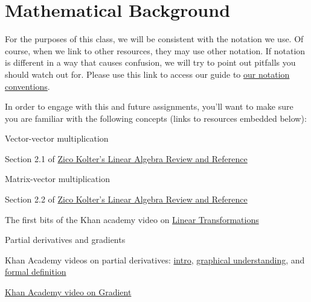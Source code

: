 \documentclass[assignment01_Solutions]{subfiles}
\begin{document}
\section{Mathematical Background}


\begin{notice}
For the purposes of this class, we will be consistent with the notation we use.  Of course, when we link to other resources, they may use other notation.  If notation is different in a way that causes confusion, we will try to point out pitfalls you should watch out for.  Please use this link to access our guide to \href{https://github.com/mlfa19/assignments/blob/master/supplementary_documents/notation_conventions.pdf}{our notation conventions}.
\end{notice}

\begin{externalresources}[(60 minutes)]
In order to engage with this and future assignments, you'll want to make sure you are familiar with the following concepts (links to resources embedded below):
\bi
\item Vector-vector multiplication
\bi
\item Section 2.1 of \href{https://see.stanford.edu/materials/aimlcs229/cs229-linalg.pdf}{Zico Kolter's Linear Algebra Review and Reference}
\ei
\item Matrix-vector multiplication
\bi
\item Section 2.2 of \href{https://see.stanford.edu/materials/aimlcs229/cs229-linalg.pdf}{Zico Kolter's Linear Algebra Review and Reference}
\item The first bits of the Khan academy video on \href{https://www.khanacademy.org/math/linear-algebra/matrix-transformations/linear-transformations/v/matrix-vector-products-as-linear-transformations}{Linear Transformations}
\ei
\item Partial derivatives and gradients
\bi
\item Khan Academy videos on partial derivatives: \href{https://www.khanacademy.org/math/multivariable-calculus/multivariable-derivatives/partial-derivatives/v/partial-derivatives-introduction}{intro}, \href{https://www.khanacademy.org/math/multivariable-calculus/multivariable-derivatives/partial-derivatives/v/partial-derivatives-and-graphs}{graphical understanding}, and \href{https://www.khanacademy.org/math/multivariable-calculus/multivariable-derivatives/partial-derivatives/v/formal-definition-of-partial-derivatives}{formal definition}
\item \href{https://www.khanacademy.org/math/multivariable-calculus/multivariable-derivatives/gradient-and-directional-derivatives/v/gradient}{Khan Academy video on Gradient}
\ei
\ei
\end{externalresources}
\end{document}
